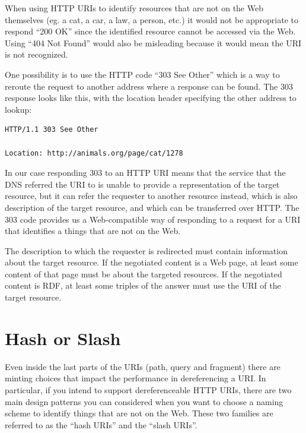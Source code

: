 When using HTTP URIs to identify resources that are not on the Web
themselves (eg. a cat, a car, a law, a person, etc.) it would not be
appropriate to respond ``200 OK'' since the identified resource cannot
be accessed via the Web. Using ``404 Not Found'' would also be
misleading because it would mean the URI is not recognized.

One possibility is to use the HTTP code ``303 See Other'' which is a way
to reroute the request to another address where a response can be found.
The 303 response looks like this, with the location header specifying
the other address to lookup:

\begin{lstlisting}
HTTP/1.1 303 See Other

Location: http://animals.org/page/cat/1278
\end{lstlisting}


In our case responding 303 to an HTTP URI means that the service that the DNS 
referred the URI to is unable to provide a representation of the target resource, but
it can refer the requester to another resource instead, which 
is also description of the target resource, and which can be
transferred over HTTP. The 303 code provides us a Web-compatible way of
responding to a request for a URI that identifies a things that are not
on the Web.

The description to which the requester is redirected must contain
information about the target resource. If the negotiated content is a
Web page, at least some content of that page must be about the targeted
resources. If the negotiated content is RDF, at least some triples of
the answer must use the URI of the target resource.

\hypertarget{hash-or-slash}{%
\section{Hash or Slash}\label{hash-or-slash}}

Even inside the last parts of the URIs (path, query and
fragment) there are minting choices that impact the performance in
dereferencing a URI. In particular, if you intend to support
dereferenceable HTTP URIs, there are two main design patterns you can 
considered when you want to choose a naming scheme to identify
things that are not on the Web. These two families are referred to as
the ``hash URIs'' and the ``slash URIs''.  


